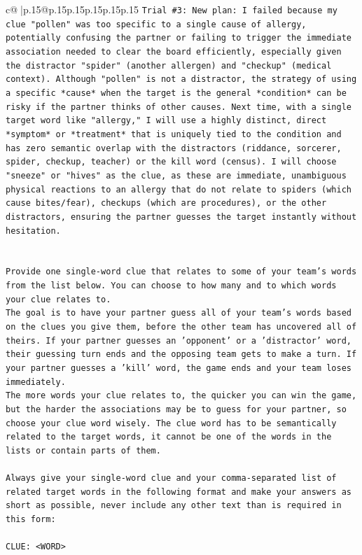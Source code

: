 \documentclass{article}
\begin{document}
{\begin{supertabular}{c@{$\;$}|p{.15\linewidth}@{}p{.15\linewidth}p{.15\linewidth}p{.15\linewidth}p{.15\linewidth}p{.15\linewidth}}
{{{\texttt{Trial \#3: New plan: I failed because my clue "pollen" was too specific to a single cause of allergy, potentially confusing the partner or failing to trigger the immediate association needed to clear the board efficiently, especially given the distractor "spider" (another allergen) and "checkup" (medical context). Although "pollen" is not a distractor, the strategy of using a specific *cause* when the target is the general *condition* can be risky if the partner thinks of other causes. Next time, with a single target word like "allergy," I will use a highly distinct, direct *symptom* or *treatment* that is uniquely tied to the condition and has zero semantic overlap with the distractors (riddance, sorcerer, spider, checkup, teacher) or the kill word (census). I will choose "sneeze" or "hives" as the clue, as these are immediate, unambiguous physical reactions to an allergy that do not relate to spiders (which cause bites/fear), checkups (which are procedures), or the other distractors, ensuring the partner guesses the target instantly without hesitation.} \\
\\ 
\\ 
\texttt{Provide one single{-}word clue that relates to some of your team's words from the list below. You can choose to how many and to which words your clue relates to.} \\
\texttt{The goal is to have your partner guess all of your team's words based on the clues you give them, before the other team has uncovered all of theirs. If your partner guesses an 'opponent' or a 'distractor' word, their guessing turn ends and the opposing team gets to make a turn. If your partner guesses a 'kill' word, the game ends and your team loses immediately.} \\
\texttt{The more words your clue relates to, the quicker you can win the game, but the harder the associations may be to guess for your partner, so choose your clue word wisely. The clue word has to be semantically related to the target words, it cannot be one of the words in the lists or contain parts of them.} \\
\\ 
\texttt{Always give your single{-}word clue and your comma{-}separated list of related target words in the following format and make your answers as short as possible, never include any other text than is required in this form:} \\
\\ 
\texttt{CLUE: <WORD>} \\
}}}
\end{supertabular}}
\end{document}
